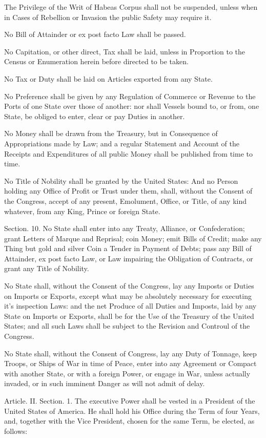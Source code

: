 \documentclass{article}
\begin{document}
The Privilege of the Writ of Habeas Corpus shall not be suspended, unless when
in Cases of Rebellion or Invasion the public Safety may require it.

No Bill of Attainder or ex post facto Law shall be passed.

No Capitation, or other direct, Tax shall be laid, unless in Proportion to the
Census or Enumeration herein before directed to be taken.

No Tax or Duty shall be laid on Articles exported from any State.

No Preference shall be given by any Regulation of Commerce or Revenue to the
Ports of one State over those of another: nor shall Vessels bound to, or from,
one State, be obliged to enter, clear or pay Duties in another.

No Money shall be drawn from the Treasury, but in Consequence of Appropriations
made by Law; and a regular Statement and Account of the Receipts and
Expenditures of all public Money shall be published from time to time.

No Title of Nobility shall be granted by the United States: And no Person
holding any Office of Profit or Trust under them, shall, without the Consent of
the Congress, accept of any present, Emolument, Office, or Title, of any kind
whatever, from any King, Prince or foreign State.


Section. 10.  No State shall enter into any Treaty, Alliance, or Confederation;
grant Letters of Marque and Reprisal; coin Money; emit Bills of Credit; make any
Thing but gold and silver Coin a Tender in Payment of Debts; pass any Bill of
Attainder, ex post facto Law, or Law impairing the Obligation of Contracts, or
grant any Title of Nobility.

No State shall, without the Consent of the Congress, lay any Imposts or Duties
on Imports or Exports, except what may be absolutely necessary for executing
it's inspection Laws: and the net Produce of all Duties and Imposts, laid by any
State on Imports or Exports, shall be for the Use of the Treasury of the United
States; and all such Laws shall be subject to the Revision and Controul of the
Congress.

No State shall, without the Consent of Congress, lay any Duty of Tonnage, keep
Troops, or Ships of War in time of Peace, enter into any Agreement or Compact
with another State, or with a foreign Power, or engage in War, unless actually
invaded, or in such imminent Danger as will not admit of delay.


Article. II.  Section. 1.  The executive Power shall be vested in a President of
the United States of America. He shall hold his Office during the Term of four
Years, and, together with the Vice President, chosen for the same Term, be
elected, as follows:
\end{document}

